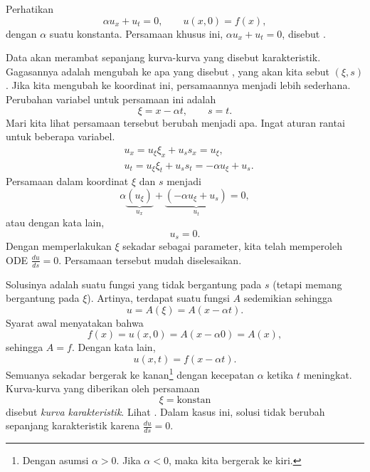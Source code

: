 \begin{example}
Perhatikan
\begin{equation*}
\alpha u_x + u_t = 0, \qquad u(x,0) = f(x) ,
\end{equation*}
dengan $\alpha$ suatu konstanta.
Persamaan khusus ini, $\alpha u_x + u_t = 0$, disebut
\emph{}.

Data akan merambat sepanjang kurva-kurva yang disebut karakteristik.  Gagasannya
adalah mengubah ke apa yang disebut
\emph{}, yang akan kita sebut
$(\xi,s)$.
Jika kita mengubah ke koordinat ini, persamaannya menjadi lebih sederhana.  Perubahan variabel untuk
persamaan ini adalah
\begin{equation*}
\xi = x - \alpha t ,  \qquad s = t .
\end{equation*}
Mari kita lihat persamaan tersebut berubah menjadi apa. Ingat aturan rantai untuk beberapa
variabel.
\begin{align*}
& u_x = u_\xi \xi_x + u_s s_x = u_\xi , \\
& u_t = u_\xi \xi_t + u_s s_t = - \alpha u_\xi + u_s .
\end{align*}
Persamaan dalam koordinat $\xi$ dan $s$ menjadi
\begin{equation*}
\alpha
\underbrace{(u_\xi)}_{u_x}
+
\underbrace{(- \alpha u_\xi + u_s)}_{u_t}
= 0 ,
\end{equation*}
atau dengan kata lain,
\begin{equation*}
u_s = 0 .
\end{equation*}
Dengan memperlakukan $\xi$ sekadar sebagai parameter, kita telah
memperoleh ODE $\frac{d u}{d s} = 0$.
Persamaan tersebut mudah diselesaikan.

Solusinya adalah suatu fungsi yang
tidak bergantung pada $s$ (tetapi memang bergantung pada $\xi$).
Artinya, terdapat suatu fungsi $A$ sedemikian sehingga
\begin{equation*}
u = A(\xi) = A(x - \alpha t) .
\end{equation*}
Syarat awal menyatakan bahwa
\begin{equation*}
f(x) = u(x,0) = A(x - \alpha 0) = A(x) ,
\end{equation*}
sehingga $A=f$.  Dengan kata lain,
\begin{equation*}
u(x,t) = f(x-\alpha t) .
\end{equation*}
Semuanya sekadar bergerak ke
kanan\footnote{Dengan asumsi $\alpha > 0$.
Jika $\alpha < 0$, maka kita bergerak ke kiri.}
dengan kecepatan $\alpha$ ketika $t$ meningkat.
Kurva-kurva yang diberikan oleh persamaan
\begin{equation*}
\xi = \text{konstan}
\end{equation*}
disebut \emph{kurva karakteristik}.
Lihat .
Dalam kasus ini, solusi tidak berubah
sepanjang karakteristik karena $\frac{du}{ds} = 0$.


\end{example}
